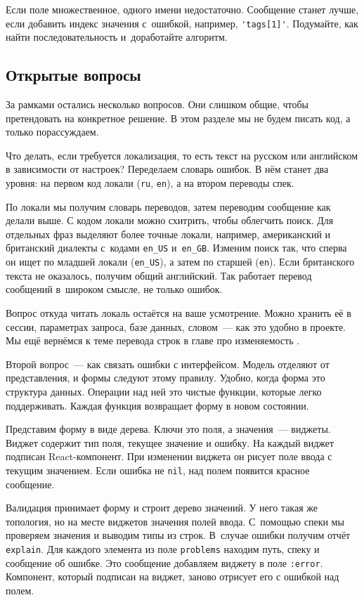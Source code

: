 Если поле множественное, одного имени недостаточно. Сообщение станет лучше, если
добавить индекс значения с~ошибкой, например, \verb|'tags[1]'|. Подумайте, как
найти последовательность  и~доработайте алгоритм.

\subsection{Открытые вопросы}

За рамками остались несколько вопросов. Они слишком общие, чтобы претендовать на
конкретное решение. В этом разделе мы не будем писать код, а только
порассуждаем.

Что делать, если требуется локализация, то есть текст на русском или английском
в зависимости от настроек? Переделаем словарь ошибок. В нём станет два уровня:
на первом код локали (\verb|ru|, \verb|en|), а на втором переводы спек.


По локали мы получим словарь переводов, затем переводим сообщение как делали
выше. С кодом локали можно схитрить, чтобы облегчить поиск. Для отдельных фраз
выделяют более точные локали, например, американский и британский диалекты
с~кодами \verb|en_US| и~\verb|en_GB|. Изменим поиск так, что сперва он ищет
по младшей локали (\verb|en_US|), а затем по старшей (\verb|en|). Если
британского текста не оказалось, получим общий английский. Так работает перевод
сообщений в~широком смысле, не только ошибок.

Вопрос откуда читать локаль остаётся на ваше усмотрение. Можно хранить её в
сессии, параметрах запроса, базе данных, словом~--- как это удобно в проекте. Мы
ещё вернёмся к теме перевода строк в главе про изменяемость .

Второй вопрос~--- как связать ошибки с интерфейсом. Модель отделяют от
представления, и формы следуют этому правилу. Удобно, когда форма это структура
данных. Операции над ней это чистые функции, которые легко поддерживать. Каждая
функция возвращает форму в новом состоянии.

Представим форму в виде дерева. Ключи это поля, а значения~--- виджеты. Виджет
содержит тип поля, текущее значение и ошибку. На каждый виджет подписан
React-компонент. При изменении виджета он рисует поле ввода с текущим
значением. Если ошибка не \verb|nil|, над полем появится красное сообщение.

Валидация принимает форму и строит дерево значений. У него такая же топология, но
на месте виджетов значения полей ввода. С~помощью спеки мы проверяем значения и
выводим типы из строк. В~случае ошибки получим отчёт \verb|explain|. Для
каждого элемента из поле \verb|problems| находим путь, спеку и сообщение об
ошибке. Это сообщение добавляем виджету в поле \verb|:error|. Компонент,
который подписан на виджет, заново отрисует его с ошибкой над полем.

